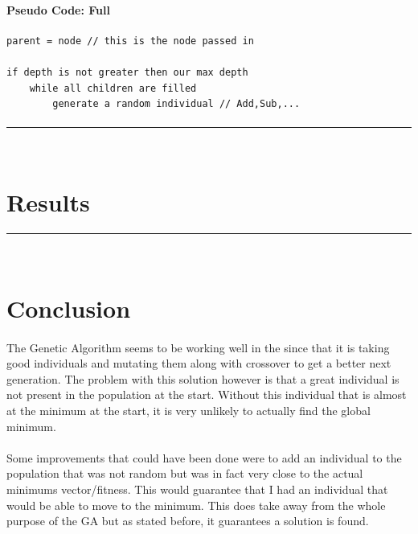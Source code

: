 \documentclass[paper=a4, fontsize=11pt]{scrartcl} %
\numberwithin{equation}{section} %
\numberwithin{figure}{section} %
\numberwithin{table}{section} %
\newcommand{\horrule}[1]{\rule{\linewidth}{#1}} %
\begin{document}
\paragraph{Pseudo Code: Full}
\begin{verbatim}
parent = node // this is the node passed in

if depth is not greater then our max depth
    while all children are filled
        generate a random individual // Add,Sub,...
\end{verbatim}

\paragraph{} 


\horrule{0.5pt} \\[0.4cm] %
\section{Results}





\horrule{0.5pt} \\[0.4cm] %
\section{Conclusion}

\paragraph{} The Genetic Algorithm seems to be working well in the since that it is taking good individuals and mutating them along with crossover to get a better next generation. The problem with this solution however is that a great individual is not present in the population at the start. Without this individual that is almost at the minimum at the start, it is very unlikely to actually find the global minimum.

\paragraph{} Some improvements that could have been done were to add an individual to the population that was not random but was in fact very close to the actual minimums vector/fitness. This would guarantee that I had an individual that would be able to move to the minimum. This does take away from the whole purpose of the GA but as stated before, it guarantees a solution is found.
\end{document}
